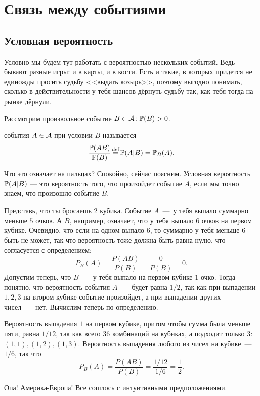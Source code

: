 \documentclass[../TV&MS.tex]{subfiles}
\begin{document}
\section{Связь между событиями}

\subsection{Условная вероятность}

\qquad Условно мы будем тут работать с вероятностью нескольких событий.
Ведь бывают разные игры: и в карты, и в кости. Есть и такие, в которых
придется не единожды просить судьбу <<выдать козырь>>, поэтому выгодно
понимать, сколько в действительности у тебя шансов дёрнуть судьбу так, 
как тебя тогда на рынке дёрнули.

Рассмотрим произвольное событие $B \in \mathcal{A} \colon \mathbb{P}(B) > 0$.
\begin{Def}
 события $A \in \mathcal{A}$ при условии $B$ называется 
$$\frac{\Pro(AB)}{\Pro(B)} \myeq \Pro(A|B) = \Pro_B(A).$$
\end{Def}

Что это означает на пальцах? Спокойно, сейчас поясним. Условная вероятность 
$\mathbb{P}(A|B)$ --- это вероятность того, что произойдет событие $A$, если мы точно знаем, 
что произошло событие $B$.

\begin{Ex}
	Представь, что ты бросаешь $2$ кубика. Событие $A$~---~у тебя выпало суммарно меньше
	$5$ очков. А $B$, например, означает, что у тебя выпало $6$ очков на первом кубике.
	Очевидно, что если на одном выпало $6$, то суммарно у тебя меньше $6$ быть не может,
	так что вероятность тоже должна быть равна нулю, что согласуется с определением:
	$$P_B(A)= \frac{P(AB)}{P(B)}= \frac{0}{P(B)}=0.$$
	Допустим теперь, что $B$~---~у тебя выпало на первом кубике $1$ очко. Тогда понятно, что
	вероятность события $A$~---~будет равна $1/2$, так как при выпадении $1,2,3$ на втором кубике
	событие произойдет, а при выпадении других чисел~---~нет. Вычислим теперь по определению.
	
	Вероятность выпадения $1$ на первом кубике, притом чтобы сумма была меньше пяти, равна
	$1/12$, так как всего $36$ комбинаций на кубиках, а подходит только $3$: $(1,1), (1,2), (1,3)$.
	Вероятность выпадения любого из чисел на кубике~---~$1/6$, так что
	$$P_B(A)= \frac{P(AB)}{P(B)}= \frac{1/12}{1/6}=\frac12.$$
	
	\noindent
	Опа! Америка-Европа! Все сошлось с интуитивными предположениями.	
\end{Ex}
\end{document}
